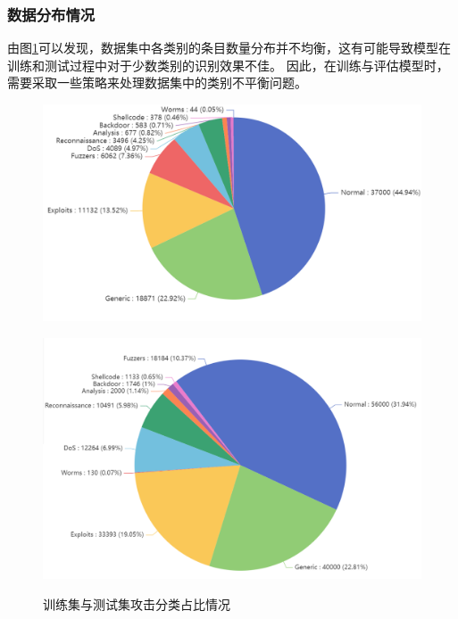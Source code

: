 \documentclass{article}
\begin{document}
\subsubsection{数据分布情况}
由图\ref{fig:combined}可以发现，数据集中各类别的条目数量分布并不均衡，这有可能导致模型在训练和测试过程中对于少数类别的识别效果不佳。
因此，在训练与评估模型时，需要采取一些策略来处理数据集中的类别不平衡问题。
\begin{figure}[H]
  \centering
  \begin{minipage}[b]{0.45\textwidth}
      \centering
      \includegraphics[width=\textwidth]{./png/acc2.png}
      \label{fig:test_set}
  \end{minipage}
  \hspace{0.05\textwidth}  %
  \begin{minipage}[b]{0.45\textwidth}
      \centering
      \includegraphics[width=\textwidth]{./png/acc1.png}
      \label{fig:train_set}
  \end{minipage}
  \caption{训练集与测试集攻击分类占比情况}
  \label{fig:combined}
\end{figure}
\end{document}
